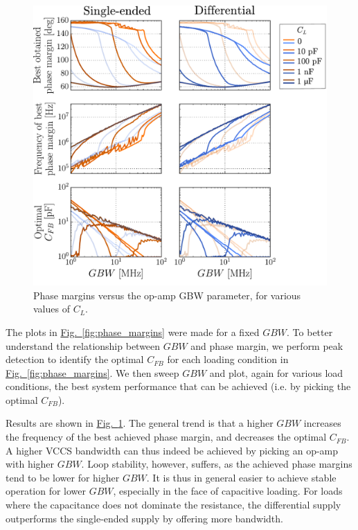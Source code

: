 \documentclass[10pt]{article}
\newcommand{\brieffiglink}[1]{\hyperref[#1]{Fig.~\ref*{#1}}}
\begin{document}
\begin{figure}[tb]
	\centering
	\includegraphics[scale=.6]{sim_phase_margins_vs_gbw_and_C_L.pdf}
	\caption{\small Phase margins versus the op-amp GBW parameter, for various values of $C_L$.}
	\label{fig:pm_vs_gbw_for_various_c_l}
\end{figure}

The plots in \brieffiglink{fig:phase_margins} were made for a fixed $GBW$. To better understand the relationship between $GBW$ and phase margin, we perform peak detection to identify the optimal $C_{FB}$ for each loading condition in \brieffiglink{fig:phase_margins}. We then sweep $GBW$ and plot, again for various load conditions, the best system performance that can be achieved (i.e. by picking the optimal $C_{FB}$).

Results are shown in \brieffiglink{fig:pm_vs_gbw_for_various_c_l}. The general trend is that a higher $GBW$ increases the frequency of the best achieved phase margin, and decreases the optimal $C_{FB}$. A higher VCCS bandwidth can thus indeed be achieved by picking an op-amp with higher $GBW$. Loop stability, however, suffers, as the achieved phase margins tend to be lower for higher $GBW$. It is thus in general easier to achieve stable operation for lower $GBW$, especially in the face of capacitive loading. For loads where the capacitance does not dominate the resistance, the differential supply outperforms the single-ended supply by offering more bandwidth.
\end{document}
